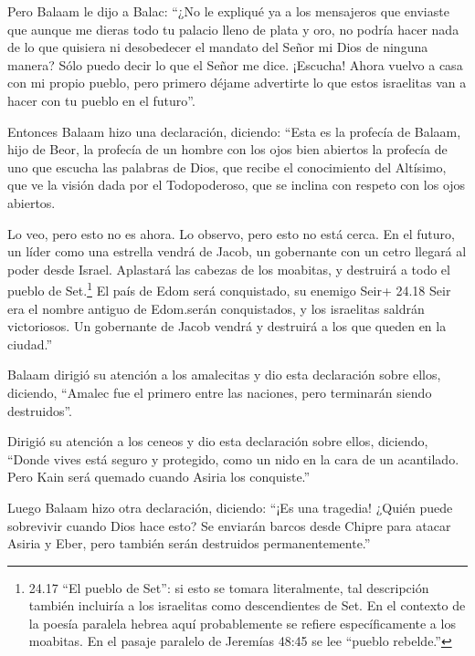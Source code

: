  Pero Balaam le dijo a Balac: ``¿No le expliqué ya a los
mensajeros que enviaste  que aunque me dieras todo tu
palacio lleno de plata y oro, no podría hacer nada de lo que quisiera ni
desobedecer el mandato del Señor mi Dios de ninguna manera? Sólo puedo
decir lo que el Señor me dice.  ¡Escucha! Ahora vuelvo a
casa con mi propio pueblo, pero primero déjame advertirte lo que estos
israelitas van a hacer con tu pueblo en el futuro''.

 Entonces Balaam hizo una declaración, diciendo: ``Esta es
la profecía de Balaam, hijo de Beor, la profecía de un hombre con los
ojos bien abiertos  la profecía de uno que escucha las
palabras de Dios, que recibe el conocimiento del Altísimo, que ve la
visión dada por el Todopoderoso, que se inclina con respeto con los ojos
abiertos.

 Lo veo, pero esto no es ahora. Lo observo, pero esto no
está cerca. En el futuro, un líder como una estrella vendrá de Jacob, un
gobernante con un cetro llegará al poder desde Israel. Aplastará las
cabezas de los moabitas, y destruirá a todo el pueblo de Set.\footnote{24.17
  ``El pueblo de Set'': si esto se tomara literalmente, tal descripción
  también incluiría a los israelitas como descendientes de Set. En el
  contexto de la poesía paralela hebrea aquí probablemente se refiere
  específicamente a los moabitas. En el pasaje paralelo de Jeremías
  48:45 se lee ``pueblo rebelde.''}  El país de Edom será
conquistado, su enemigo Seir+ 24.18 Seir era el nombre antiguo de
Edom.serán conquistados, y los israelitas saldrán victoriosos.
 Un gobernante de Jacob vendrá y destruirá a los que queden
en la ciudad.''

 Balaam dirigió su atención a los amalecitas y dio esta
declaración sobre ellos, diciendo, ``Amalec fue el primero entre las
naciones, pero terminarán siendo destruidos''.

 Dirigió su atención a los ceneos y dio esta declaración
sobre ellos, diciendo, ``Donde vives está seguro y protegido, como un
nido en la cara de un acantilado.  Pero Kain será quemado
cuando Asiria los conquiste.''

 Luego Balaam hizo otra declaración, diciendo: ``¡Es una
tragedia! ¿Quién puede sobrevivir cuando Dios hace esto? 
Se enviarán barcos desde Chipre para atacar Asiria y Eber, pero también
serán destruidos permanentemente.''

